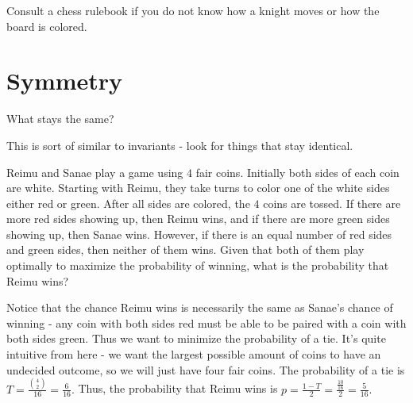 Consult a chess rulebook if you do not know how a knight moves or how the board is colored.

\section{Symmetry}
What stays the same?

This is sort of similar to invariants - look for things that stay identical.

\begin{exam}[HMMT 2019]
Reimu and Sanae play a game using $4$ fair coins. Initially both sides of each coin are white. Starting with Reimu, they take turns to color one of the white sides either red or green. After all sides are colored, the $4$ coins are tossed. If there are more red sides showing up, then Reimu wins, and if there are more green sides showing up, then Sanae wins. However, if there is an equal number of red sides and green sides, then neither of them wins. Given that both of them play optimally to maximize the probability of winning, what is the probability that Reimu wins?
\end{exam}

\begin{sol}Notice that the chance Reimu wins is necessarily the same as Sanae's chance of winning - any coin with both sides red must be able to be paired with a coin with both sides green. Thus we want to minimize the probability of a tie. It's quite intuitive from here - we want the largest possible amount of coins to have an undecided outcome, so we will just have four fair coins. The probability of a tie is $T=\frac{\binom{4}{2}}{16}=\frac{6}{16}.$ Thus, the probability that Reimu wins is $p=\frac{1-T}{2}=\frac{\frac{10}{16}}{2}=\frac{5}{16}.$\end{sol}